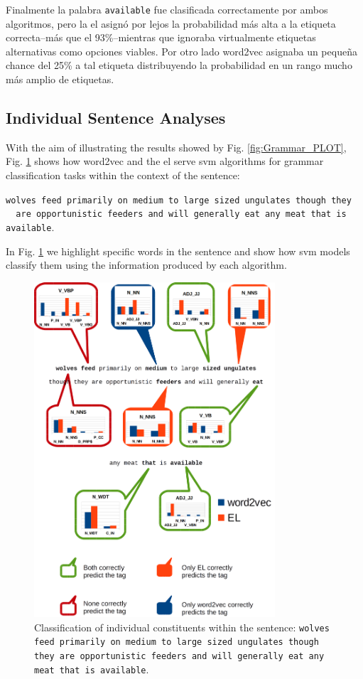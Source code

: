 {Finalmente la palabra \texttt{available} fue clasificada correctamente por ambos algoritmos, pero la \gls{el} asignó por lejos la probabilidad más alta a la etiqueta correcta--más que el 93\%--mientras que ignoraba virtualmente etiquetas alternativas como opciones viables. Por otro lado word2vec asignaba un pequeña chance del 25\% a tal etiqueta distribuyendo la probabilidad en un rango mucho más amplio de etiquetas.
}{
\subsection{Individual Sentence Analyses}
\label{SentenceAnalysis}

With the aim of illustrating the results showed by Fig. \ref{fig:Grammar_PLOT}, Fig. \ref{fig:Sentence1} shows how word2vec and the \gls{el} serve \gls{svm} algorithms for grammar classification tasks within the context of the sentence:

\begin{sloppypar}
\texttt{wolves feed primarily on medium to large sized ungulates though they ~~are opportunistic feeders and will generally eat any meat that is available}.
\end{sloppypar}

In Fig. \ref{fig:Sentence1} we highlight specific words in the sentence and show how \gls{svm} models classify them using the information produced by each algorithm.

\begin{figure}[ht!]
    \centering
    \includegraphics[width=0.8\textwidth]{Sentence1.png}
    \caption{Classification of individual constituents within the sentence: \texttt{wolves feed primarily on medium to large sized ungulates though they are opportunistic feeders and will generally eat any meat that is available}.}
    \label{fig:Sentence1}
\end{figure}

}
